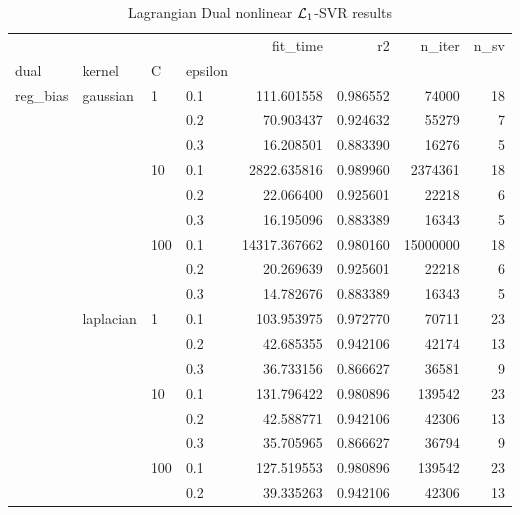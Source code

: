 \begin{table}[H]
\centering
\caption{Lagrangian Dual nonlinear $\protect \mathcal{L}_1$-SVR results}
\label{nonlinear_lagrangian_dual_l1_svr_cv_results}
\begin{tabular}{llllrrrr}
\toprule
           &           &     &     &      fit\_time &        r2 &    n\_iter &  n\_sv \\
dual & kernel & C & epsilon &               &           &           &       \\
\midrule
reg\_bias & gaussian & 1   & 0.1 &    111.601558 &  0.986552 &     74000 &    18 \\
           &           &     & 0.2 &     70.903437 &  0.924632 &     55279 &     7 \\
           &           &     & 0.3 &     16.208501 &  0.883390 &     16276 &     5 \\
           &           & 10  & 0.1 &   2822.635816 &  0.989960 &   2374361 &    18 \\
           &           &     & 0.2 &     22.066400 &  0.925601 &     22218 &     6 \\
           &           &     & 0.3 &     16.195096 &  0.883389 &     16343 &     5 \\
           &           & 100 & 0.1 &  14317.367662 &  0.980160 &  15000000 &    18 \\
           &           &     & 0.2 &     20.269639 &  0.925601 &     22218 &     6 \\
           &           &     & 0.3 &     14.782676 &  0.883389 &     16343 &     5 \\
           & laplacian & 1   & 0.1 &    103.953975 &  0.972770 &     70711 &    23 \\
           &           &     & 0.2 &     42.685355 &  0.942106 &     42174 &    13 \\
           &           &     & 0.3 &     36.733156 &  0.866627 &     36581 &     9 \\
           &           & 10  & 0.1 &    131.796422 &  0.980896 &    139542 &    23 \\
           &           &     & 0.2 &     42.588771 &  0.942106 &     42306 &    13 \\
           &           &     & 0.3 &     35.705965 &  0.866627 &     36794 &     9 \\
           &           & 100 & 0.1 &    127.519553 &  0.980896 &    139542 &    23 \\
           &           &     & 0.2 &     39.335263 &  0.942106 &     42306 &    13 \\

\end{tabular}
\end{table}
